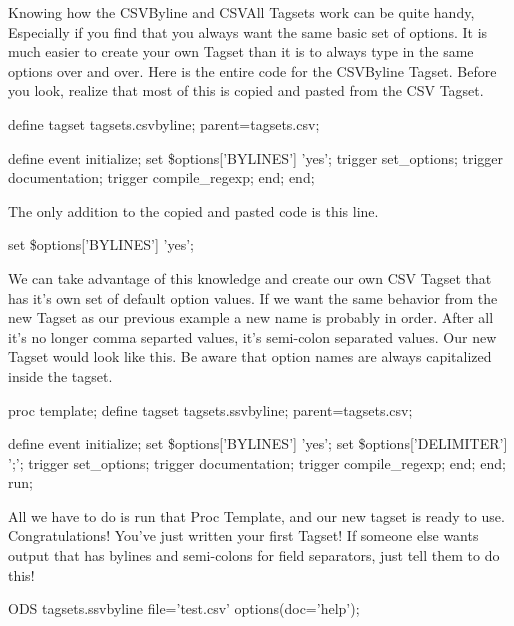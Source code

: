 Knowing how the CSVByline and CSVAll Tagsets work can be quite handy, Especially
if you find that you always want the same basic set of options.  It is much easier
to create your own Tagset than it is to always type in the same options over and over.
Here is the entire code for the CSVByline Tagset.  Before you look, realize that most
of this is copied and pasted from the CSV Tagset.

\begin{sfvcode}
   define tagset tagsets.csvbyline;
       parent=tagsets.csv;

        define event initialize;
            set \$options['BYLINES'] 'yes';
            trigger set_options;
            trigger documentation;
            trigger compile_regexp;
        end;
    end;
\end{sfvcode}

The only addition to the copied and pasted code is this line.

\begin{sfvcode}
            set \$options['BYLINES'] 'yes';
\end{sfvcode}

We can take advantage of this knowledge and create our own CSV Tagset that
has it's own set of default option values.  If we want the same behavior from
the new Tagset as 
our previous example a new name is probably in order.  After all it's no longer
comma separted values, it's semi-colon separated values. 
Our new Tagset would look like this.  Be aware that option
names are always capitalized inside the tagset.

\begin{sfvcode}
proc template;
   define tagset tagsets.ssvbyline;
       parent=tagsets.csv;

        define event initialize;
            set \$options['BYLINES'] 'yes';
            set \$options['DELIMITER'] ';';
            trigger set_options;
            trigger documentation;
            trigger compile_regexp;
        end;
    end;
run;
\end{sfvcode}

All we have to do is run that Proc Template, and our new tagset is ready to use.
Congratulations! You've just written your first Tagset!  If someone else wants 
output that has bylines and semi-colons for field separators, just tell them to
do this!

\begin{sfvcode}
     ODS tagsets.ssvbyline file='test.csv' options(doc='help');
\end{sfvcode}

